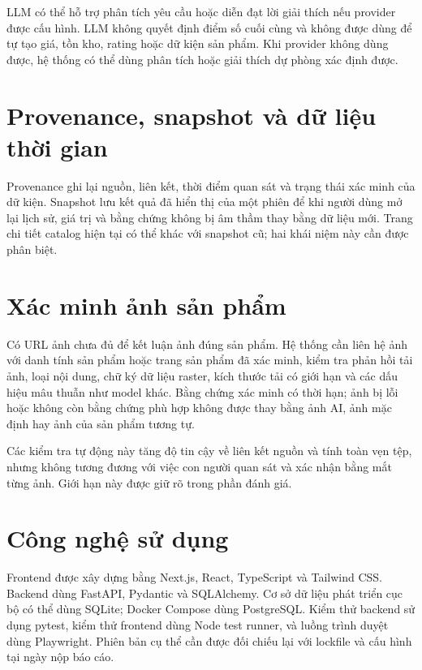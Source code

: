 LLM có thể hỗ trợ phân tích yêu cầu hoặc diễn đạt lời giải thích nếu provider được cấu hình. LLM không quyết định điểm số cuối cùng và không được dùng để tự tạo giá, tồn kho, rating hoặc dữ kiện sản phẩm. Khi provider không dùng được, hệ thống có thể dùng phân tích hoặc giải thích dự phòng xác định được.

\section{Provenance, snapshot và dữ liệu thời gian}

Provenance ghi lại nguồn, liên kết, thời điểm quan sát và trạng thái xác minh của dữ kiện. Snapshot lưu kết quả đã hiển thị của một phiên để khi người dùng mở lại lịch sử, giá trị và bằng chứng không bị âm thầm thay bằng dữ liệu mới. Trang chi tiết catalog hiện tại có thể khác với snapshot cũ; hai khái niệm này cần được phân biệt.

\section{Xác minh ảnh sản phẩm}

Có URL ảnh chưa đủ để kết luận ảnh đúng sản phẩm. Hệ thống cần liên hệ ảnh với danh tính sản phẩm hoặc trang sản phẩm đã xác minh, kiểm tra phản hồi tải ảnh, loại nội dung, chữ ký dữ liệu raster, kích thước tải có giới hạn và các dấu hiệu mâu thuẫn như model khác. Bằng chứng xác minh có thời hạn; ảnh bị lỗi hoặc không còn bằng chứng phù hợp không được thay bằng ảnh AI, ảnh mặc định hay ảnh của sản phẩm tương tự.

Các kiểm tra tự động này tăng độ tin cậy về liên kết nguồn và tính toàn vẹn tệp, nhưng không tương đương với việc con người quan sát và xác nhận bằng mắt từng ảnh. Giới hạn này được giữ rõ trong phần đánh giá.

\section{Công nghệ sử dụng}

Frontend được xây dựng bằng Next.js, React, TypeScript và Tailwind CSS. Backend dùng FastAPI, Pydantic và SQLAlchemy. Cơ sở dữ liệu phát triển cục bộ có thể dùng SQLite; Docker Compose dùng PostgreSQL. Kiểm thử backend sử dụng pytest, kiểm thử frontend dùng Node test runner, và luồng trình duyệt dùng Playwright. Phiên bản cụ thể cần được đối chiếu lại với lockfile và cấu hình tại ngày nộp báo cáo.
